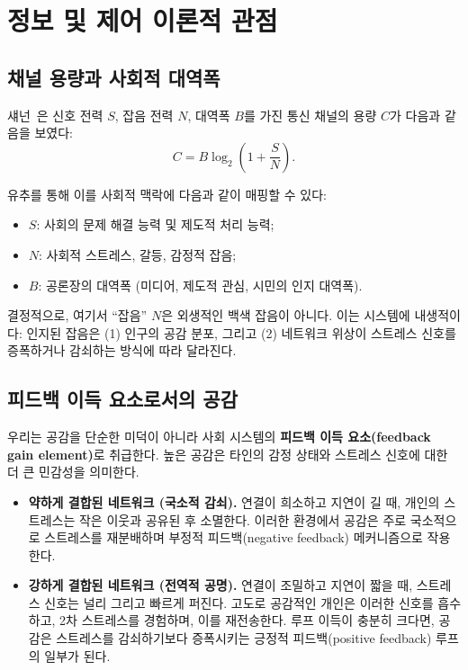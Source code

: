 \documentclass[11pt]{article}
\theoremstyle{plain}
\begin{document}
\section{정보 및 제어 이론적 관점}

\subsection{채널 용량과 사회적 대역폭}

섀넌~\cite{shannon1948}은 신호 전력 $S$, 잡음 전력 $N$, 대역폭 $B$를 가진 통신 채널의 용량 $C$가 다음과 같음을 보였다:
\begin{equation}
C = B \log_2\left(1 + \frac{S}{N}\right).
\end{equation}

유추를 통해 이를 사회적 맥락에 다음과 같이 매핑할 수 있다:
\begin{itemize}
  \item $S$: 사회의 문제 해결 능력 및 제도적 처리 능력;
  \item $N$: 사회적 스트레스, 갈등, 감정적 잡음;
  \item $B$: 공론장의 대역폭 (미디어, 제도적 관심, 시민의 인지 대역폭).
\end{itemize}

결정적으로, 여기서 ``잡음'' $N$은 외생적인 백색 잡음이 아니다.
이는 시스템에 내생적이다: 인지된 잡음은 (1) 인구의 공감 분포, 그리고 (2) 네트워크 위상이 스트레스 신호를 증폭하거나 감쇠하는 방식에 따라 달라진다.

\subsection{피드백 이득 요소로서의 공감}

우리는 공감을 단순한 미덕이 아니라 사회 시스템의 \textbf{피드백 이득 요소(feedback gain element)}로 취급한다.
높은 공감은 타인의 감정 상태와 스트레스 신호에 대한 더 큰 민감성을 의미한다.

\begin{itemize}
  \item \textbf{약하게 결합된 네트워크 (국소적 감쇠).}  
  연결이 희소하고 지연이 길 때, 개인의 스트레스는 작은 이웃과 공유된 후 소멸한다.
  이러한 환경에서 공감은 주로 국소적으로 스트레스를 재분배하며 부정적 피드백(negative feedback) 메커니즘으로 작용한다.

  \item \textbf{강하게 결합된 네트워크 (전역적 공명).}  
  연결이 조밀하고 지연이 짧을 때, 스트레스 신호는 널리 그리고 빠르게 퍼진다.
  고도로 공감적인 개인은 이러한 신호를 흡수하고, 2차 스트레스를 경험하며, 이를 재전송한다.
  루프 이득이 충분히 크다면, 공감은 스트레스를 감쇠하기보다 증폭시키는 긍정적 피드백(positive feedback) 루프의 일부가 된다.
\end{itemize}
\end{document}
